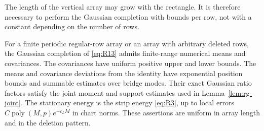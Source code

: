 The length of the vertical array may grow with the rectangle.  It is
therefore necessary to perform the Gaussian completion with bounds per
row, not with a constant depending on the number of rows.

\begin{lemma}
\label{lem:init-completion}
For a finite periodic regular-row array or an array with arbitrary deleted
rows, the Gaussian completion of \eqref{eq:R13} admits finite-range
numerical means and covariances.  The covariances have uniform positive
upper and lower bounds.  The means and covariance deviations from the
identity have exponential position bounds and summable estimates over
bridge modes.  Their exact Gaussian ratio factors satisfy the joint
moment and support estimates used in Lemma~\ref{lem:rg-joint}.
The stationary energy is the strip energy \eqref{eq:R3}, up to local
errors $C\operatorname{poly}(M,p)e^{-c_LM}$ in chart norms.  These
assertions are uniform in array length and in the deletion pattern.
\end{lemma}


